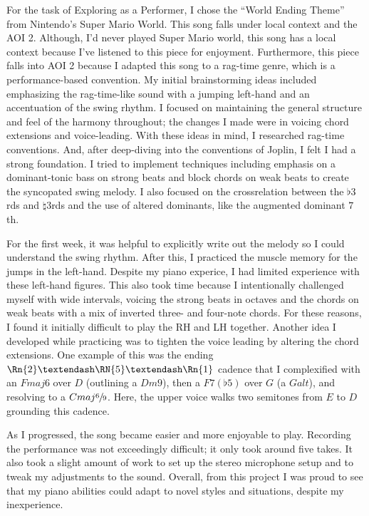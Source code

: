\documentclass[12pt]{article}
\begin{document}
For the task of Exploring as a Performer, I chose the “World Ending Theme” from Nintendo's Super Mario World. This song falls under local context and the AOI 2. Although, I'd never played Super Mario world, this song has a local context because I've listened to this piece for enjoyment. Furthermore, this piece falls into AOI 2 because I adapted this song to a rag-time genre, which is a performance-based convention. 
My initial brainstorming ideas included emphasizing the rag-time-like sound with a jumping left-hand and an accentuation of the swing rhythm. I focused on maintaining the general structure and feel of the harmony throughout; the changes I made were in voicing chord extensions and voice-leading. With these ideas in mind, I researched rag-time conventions. And, after deep-diving into the conventions of Joplin, I felt I had a strong foundation. I tried to implement techniques including emphasis on a dominant-tonic bass on strong beats and block chords on weak beats to create the syncopated swing melody. I also focused on the crossrelation between the $\flat 3$rds and $\natural 3$rds and the use of altered dominants, like the augmented dominant $7$th.
 
For the first week, it was helpful to explicitly write out the melody so I could understand the swing rhythm. After this, I practiced the muscle memory for the jumps in the left-hand. Despite my piano experice, I had limited experience with these left-hand figures. This also took time because I intentionally challenged myself with wide intervals, voicing the strong beats in octaves and the chords on weak beats with a mix of inverted three- and four-note chords. For these reasons, I found it initially difficult to play the RH and LH together. Another idea I developed while practicing was to tighten the voice leading by altering the chord extensions. One example of this was the ending $\Rn{2}–\RN{5}–\Rn{1}$ cadence that I complexified with an $Fmaj6$ over $D$ (outlining a $Dm9$), then a $F7(\flat 5)$ over $G$ (a $Galt$), and resolving to a $Cmaj\sfrac{6}{9}$. Here, the upper voice walks two semitones from $E$ to $D$ grounding this cadence. 
 
As I progressed, the song became easier and more enjoyable to play. Recording the performance was not exceedingly difficult; it only took around five takes. It also took a slight amount of work to set up the stereo microphone setup and to tweak my adjustments to the sound. Overall, from this project I was proud to see that my piano abilities could adapt to novel styles and situations, despite my inexperience.
\end{document}
